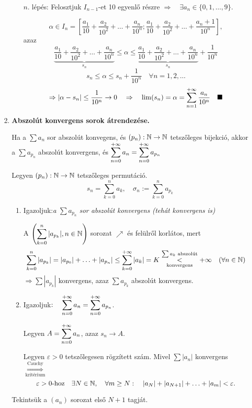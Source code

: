 \documentclass[a4paper,11.5pt]{article}
\begin{document}
\begin{enumerate}
\begin{enumerate}[1. lépés:]
			\item[$n$. lépés:] Felosztjuk $I_{n-1}$-et 10 egyenlő részre \quad $\Rightarrow \quad \exists a_n\in\{0,1,\ldots,9\}.$
			
			\[\alpha\in I_n=\left[\frac{a_1}{10}+\frac{a_2}{10^2}+\ldots+\frac{a_n}{10^n};\frac{a_1}{10}+\frac{a_2}{10^2}+\ldots+\frac{a_{n}+1}{10^n}\right],\]
			azaz
			\[\underbrace{\frac{a_1}{10}+\frac{a_2}{10^2}+\ldots+\frac{a_n}{10^n}}_{s_n}\leq \alpha \leq \underbrace{\frac{a_1}{10}+\frac{a_2}{10^2}+\ldots+\frac{a_n}{10^n}}_{s_n}+\frac{1}{10^n}\]
			\[s_n\leq\alpha\leq s_n+\frac{1}{10^n}\quad \forall n=1,2,\ldots\]
			\[\Rightarrow|\alpha-s_n|\leq\frac{1}{10^n}\to0\quad \Rightarrow\quad \lim(s_n)=\alpha=\displaystyle\sum_{n=1}^{+\infty} \frac{a_n}{10^n}\quad \blacksquare\]
		\end{enumerate}
		
		\item\textbf{Abszolút konvergens sorok átrendezése.}
		
		Ha a $\sum a_n$ sor abszolút konvegens, és $(p_n): \mathbb{N} \to \mathbb{N}$ tetszőleges bijekció, akkor a $\sum a_{p_n}$ abszolút konvergens, és $\displaystyle\sum_{n=0}^{+\infty} a_n=\displaystyle\sum_{n=0}^{+\infty} a_{p_n}$
		
		\biz Legyen $(p_n):\mathbb{N}\to\mathbb{N}$ tetszőleges permutáció.
		\[s_n=\sum_{k=0}^na_k,\quad\sigma_n:=\sum_{k=0}^na_{p_k}\]
		\begin{enumerate}
			\item Igazoljuk:\quad  \textit{a} $\displaystyle\sum a_{p_n}$ \textit{sor abszolút konvergens (tehát konvergens is)}
			
			A $\displaystyle\left(\sum_{k=0}^n|a_{p_k}|, n\in \mathbb{N}\right)$ sorozat $\nearrow$ és felülről korlátos, mert 
			\[\sum_{k=0}^n|a_{p_k}|=|a_{p_0}|+\ldots+|a_{p_n}|\leq\sum_{k=0}^{+\infty}|a_k|=K\overset{\sum a_k \text{ abszolút}}{\underset{\text{konvergens}}{<}}+\infty\quad (\forall n \in \mathbb{N})\]
			$\Rightarrow\displaystyle\sum|a_{p_k}|$ konvergens, azaz $\displaystyle\sum a_{p_k}$ abszolút konvergens.
			
			\item Igazoljuk$:\quad  \displaystyle\displaystyle\sum_{n=0}^{+\infty} a_n=\sum_{n=0}^{+\infty} a_{p_n}$.
			
			Legyen $A=\displaystyle\sum_{n=0}^{+\infty} a_n$, azaz $s_n\to A$.
			
			Legyen $\varepsilon>0$ tetszőlegesen rögzített szám. Mivel $\displaystyle\sum|a_n|$ konvergens $\overset{\text{Cauchy}}{\underset{\text{kritérium}}{\Longrightarrow}}$
			\[\varepsilon>0\text{-hoz}\quad \exists N\in \mathbb{N},\quad \forall m\geq N:\quad |a_N|+|a_{N+1}|+\ldots+|a_m|<\varepsilon.\]
		\end{enumerate}
		Tekintsük a $(a_n)$ sorozat első $N+1$ tagját.
		

\end{enumerate}
\end{document}
